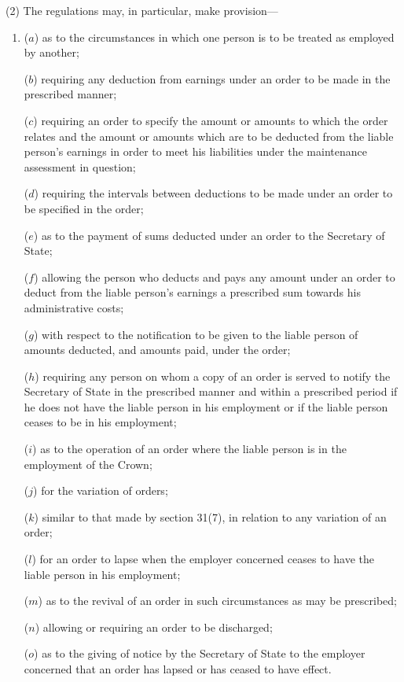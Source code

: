 \documentclass[12pt,a4paper]{article}
\begin{document}
(2) The regulations may, in particular, make provision—
\begin{enumerate}\item[]
($a$) as to the circumstances in which one person is to be treated as employed by another;

($b$) requiring any deduction from earnings under an order to be made in the prescribed manner;

($c$) requiring an order to specify the amount or amounts to which the order relates and the amount or amounts which are to be deducted from the liable person’s earnings in order to meet his liabilities under the maintenance assessment in question;

($d$) requiring the intervals between deductions to be made under an order to be specified in the order;

($e$) as to the payment of sums deducted under an order to the Secretary of State;

($f$) allowing the person who deducts and pays any amount under an order to deduct from the liable person’s earnings a prescribed sum towards his administrative costs;

($g$) with respect to the notification to be given to the liable person of amounts deducted, and amounts paid, under the order;

($h$) requiring any person on whom a copy of an order is served to notify the Secretary of State in the prescribed manner and within a prescribed period if he does not have the liable person in his employment or if the liable person ceases to be in his employment;

($i$) as to the operation of an order where the liable person is in the employment of the Crown;

($j$) for the variation of orders;

($k$) similar to that made by section 31(7), in relation to any variation of an order;

($l$) for an order to lapse when the employer concerned ceases to have the liable person in his employment;

($m$) as to the revival of an order in such circumstances as may be prescribed;

($n$) allowing or requiring an order to be discharged;

($o$) as to the giving of notice by the Secretary of State to the employer concerned that an order has lapsed or has ceased to have effect.
\end{enumerate}
\end{document}
